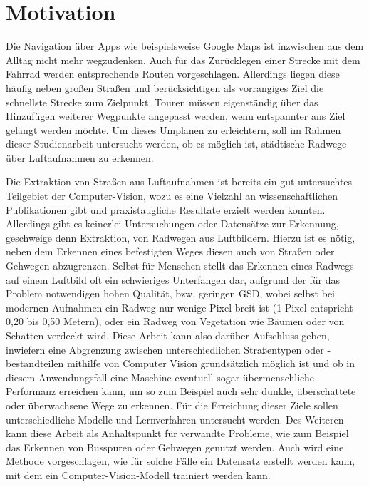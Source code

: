 \chapter{Motivation} \label{sec:motivation} \label{mot:ziele} \label{mot:strukt}

Die Navigation über Apps wie beispielsweise Google Maps ist inzwischen aus dem Alltag nicht mehr wegzudenken.
Auch für das Zurücklegen einer Strecke mit dem Fahrrad werden entsprechende Routen vorgeschlagen.
Allerdings liegen diese häufig neben großen Straßen und berücksichtigen als vorrangiges Ziel die schnellste Strecke zum Zielpunkt.
Touren müssen eigenständig über das Hinzufügen weiterer Wegpunkte angepasst werden, wenn entspannter ans Ziel gelangt werden möchte.
Um dieses Umplanen zu erleichtern, soll im Rahmen dieser Studienarbeit untersucht werden, ob es möglich ist, 
städtische Radwege über Luftaufnahmen zu erkennen.

Die Extraktion von Straßen aus Luftaufnahmen ist bereits
ein gut untersuchtes Teilgebiet der Computer-Vision, wozu es eine Vielzahl an wissenschaftlichen Publikationen gibt
und praxistaugliche Resultate erzielt werden konnten. \\
Allerdings gibt es keinerlei Untersuchungen oder Datensätze zur Erkennung, geschweige denn Extraktion,
von Radwegen aus Luftbildern. Hierzu ist es nötig, neben dem Erkennen eines befestigten Weges  
diesen auch von Straßen oder Gehwegen abzugrenzen. Selbst für 
Menschen stellt das Erkennen eines Radwegs auf einem Luftbild oft ein schwieriges Unterfangen dar, 
aufgrund der für das Problem notwendigen hohen Qualität, bzw. geringen \ac{GSD}, wobei selbst bei modernen 
Aufnahmen ein Radweg nur wenige Pixel breit ist (1 Pixel entspricht 0,20 bis 0,50 Metern), oder ein Radweg von Vegetation wie Bäumen oder von Schatten verdeckt wird.
Diese Arbeit kann also darüber Aufschluss geben, inwiefern eine Abgrenzung zwischen unterschiedlichen Straßentypen oder -bestandteilen mithilfe von Computer Vision
grundsätzlich möglich ist und ob in diesem Anwendungsfall eine Maschine eventuell sogar übermenschliche Performanz 
erreichen kann, um so zum Beispiel auch sehr dunkle, überschattete oder überwachsene Wege zu erkennen. 
Für die Erreichung dieser Ziele sollen unterschiedliche Modelle und Lernverfahren untersucht werden. 
Des Weiteren kann diese Arbeit als Anhaltspunkt für verwandte Probleme, wie zum Beispiel das Erkennen von Busspuren 
oder Gehwegen genutzt werden. Auch wird eine Methode vorgeschlagen, wie für solche Fälle ein Datensatz erstellt werden 
kann, mit dem ein Computer-Vision-Modell trainiert werden kann. 



